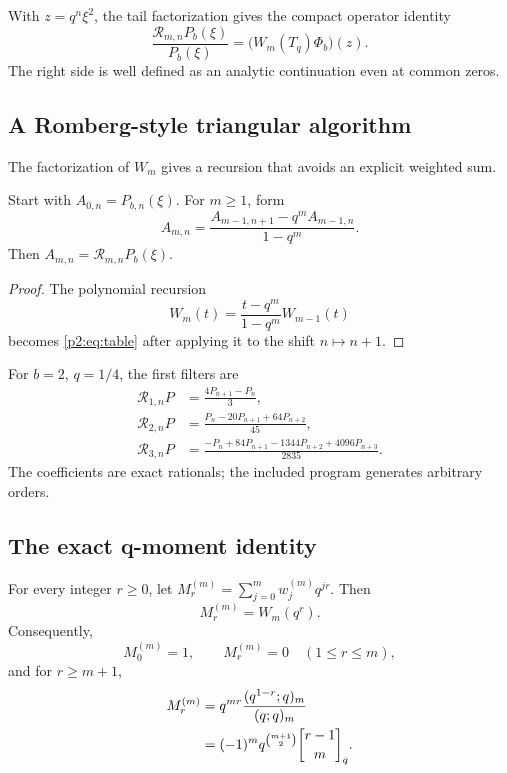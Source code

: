 \documentclass[11pt,oneside]{article}
\numberwithin{equation}{section}
\theoremstyle{definition}
\theoremstyle{remark}
\begin{document}
With \(z=q^n\xi^2\), the tail factorization gives the compact operator identity
\begin{equation}
 \frac{\mathcal R_{m,n}P_b(\xi)}{P_b(\xi)}
 =\bigl(W_m(T_q)\Phi_b\bigr)(z).
 \label{p2:eq:operatoridentity}
\end{equation}
The right side is well defined as an analytic continuation even at common zeros.

\subsection{A Romberg-style triangular algorithm}

The factorization of \(W_m\) gives a recursion that avoids an explicit weighted
sum.

\begin{algorithm}
\label{p2:alg:table}
Start with \(A_{0,n}=P_{b,n}(\xi)\). For \(m\geq1\), form
\begin{equation}
 A_{m,n}=\frac{A_{m-1,n+1}-q^mA_{m-1,n}}{1-q^m}.
 \label{p2:eq:table}
\end{equation}
Then \(A_{m,n}=\mathcal R_{m,n}P_b(\xi)\).
\end{algorithm}

\begin{proof}
The polynomial recursion
\[
 W_m(t)=\frac{t-q^m}{1-q^m}W_{m-1}(t)
\]
becomes \eqref{p2:eq:table} after applying it to the shift \(n\mapsto n+1\).
\end{proof}

For \(b=2\), \(q=1/4\), the first filters are
\begin{align}
 \mathcal R_{1,n}P&=\frac{4P_{n+1}-P_n}{3},
 \label{p2:eq:m1}\\
 \mathcal R_{2,n}P&=\frac{P_n-20P_{n+1}+64P_{n+2}}{45},
 \label{p2:eq:m2}\\
 \mathcal R_{3,n}P&=\frac{-P_n+84P_{n+1}-1344P_{n+2}+4096P_{n+3}}{2835}.
 \label{p2:eq:m3}
\end{align}
The coefficients are exact rationals; the included program generates arbitrary
orders.

\subsection{The exact q-moment identity}

\begin{lemma}
\label{p2:lem:qmoments}
For every integer \(r\geq0\), let
\(M_r^{(m)}=\sum_{j=0}^m w_j^{(m)}q^{jr}\). Then
\begin{equation}
 M_r^{(m)}=W_m(q^r).
 \label{p2:eq:MrW}
\end{equation}
Consequently,
\begin{equation}
 M_0^{(m)}=1,
 \qquad M_r^{(m)}=0\quad(1\leq r\leq m),
 \label{p2:eq:cancelmom}
\end{equation}
and for \(r\geq m+1\),
\begin{align}
 M_r^{(m)}
 &=q^{mr}\frac{(q^{1-r};q)_m}{(q;q)_m}
 \label{p2:eq:Mrpoch}\\
 &=(-1)^m q^{\binom{m+1}{2}}\qbinomPartx{r-1}{m}.
 \label{p2:eq:Mrqbinom}
\end{align}
\end{lemma}
\end{document}
